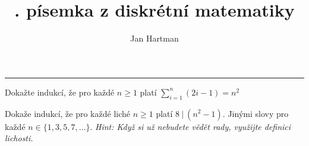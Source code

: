 \documentclass[10pt]{article}
\title{\tutnum. písemka z diskrétní matematiky}
\author{Jan Hartman}
\newcommand{\titlerule}{%
    \noindent %
    \makebox[\textwidth]{\large \thetitle \hfill Jméno: \hspace{4cm}}
    \rule{\textwidth}{0.4pt}%
}
\begin{document}
\titlerule

\begin{problem}[4 body]
Dokažte indukcí, že pro každé $n \geq 1$ platí $\sum_{i=1}^{n}(2i-1) = n^2$
\end{problem}

\begin{problem}[6 bodů]

Dokaže indukcí, že pro každé liché $n \geq 1$ platí $8 \ | \ (n^2 - 1)$. Jinými slovy pro každé $n \in \{1,3,5,7,\ldots\}$. \textit{Hint: Když si už nebudete vědět rady, využijte definici lichosti.}

\end{problem}
\end{document}
